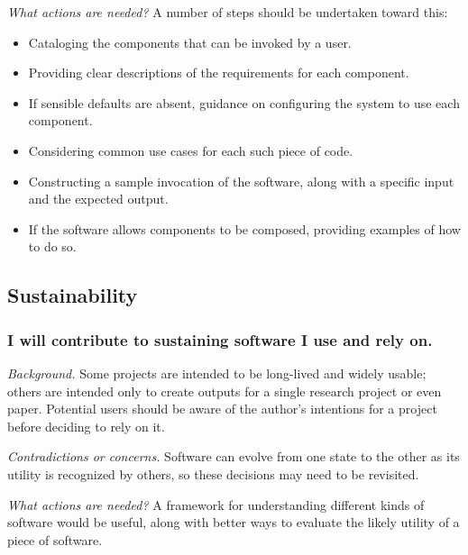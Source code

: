 \documentclass[a4paper,UKenglish]{dagman}
\renewcommand{\paragraph}[1]{\subsubsection*{#1}\xspace}
\begin{document}

\emph{What actions are needed?}
A number of steps should be undertaken toward this:
\begin{itemize}
\item Cataloging the components that can be invoked by a user.
\item Providing clear descriptions of the requirements for each component.
\item If sensible defaults are absent, guidance on configuring the system to use each component.
\item Considering common use cases for each such piece of code.
\item Constructing a sample invocation of the software, along with a specific input and the expected output.
\item If the software allows components to be composed, providing examples of how to do so.
\end{itemize}

\subsection{Sustainability}


\paragraph{I will contribute to sustaining software I use and rely on.}

\emph{Background.} Some projects are intended to be long-lived and widely usable; others are intended only to create outputs for a single research project or even paper. Potential users should be aware of the author's intentions for a project before deciding to rely on it.  

\emph{Contradictions or concerns.} Software can evolve from one state to the other as its utility is recognized by others, so these decisions may need to be revisited. 


\emph{What actions are needed?}
A framework for understanding different kinds of software would be useful, along with better ways to evaluate the likely utility of a piece of software. 
\end{document}

